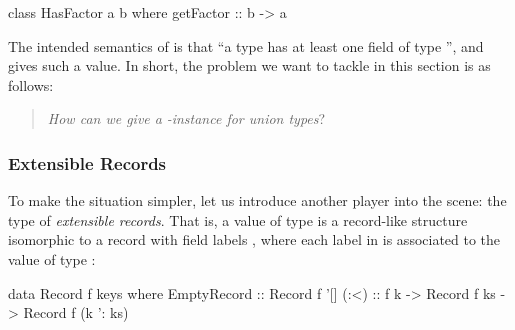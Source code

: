 \documentclass[demotion-paper.tex]{subfiles}
\begin{document}
\begin{code}
class HasFactor a b where
  getFactor :: b -> a
\end{code}

The intended semantics of  is that ``a type  has at least one field of type '', and  gives such a value.
In short, the problem we want to tackle in this section is as follows:
\begin{quote}
  \emph{How can we give a} \emph{-instance for union types}?
\end{quote}

\subsubsection{Extensible Records}
To make the situation simpler, let us introduce another player into the scene: the type  of \emph{extensible records}.
That is, a value of type  is a record-like structure isomorphic to a record with field labels , where each label  in  is associated to the value of type :

\begin{code}
data Record f keys where
  EmptyRecord :: Record f '[]
  (:<) :: f k -> Record f ks -> Record f (k ': ks)
\end{code}
\end{document}

